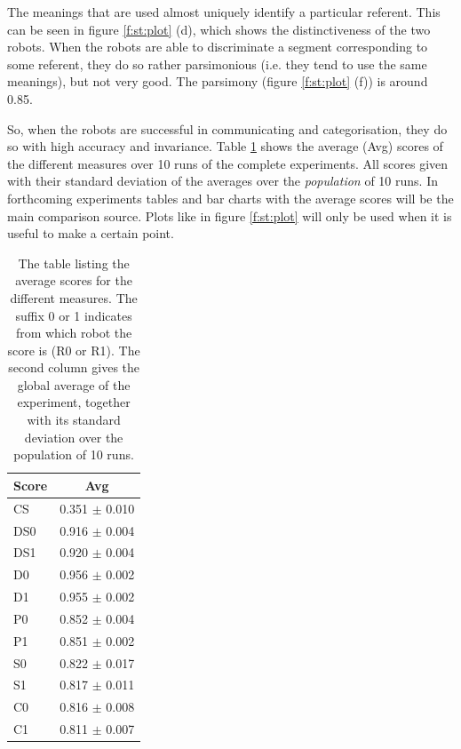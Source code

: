 The meanings that are used almost uniquely identify a particular referent. This can be seen in figure \ref{f:st:plot} (d), which shows the distinctiveness of the two robots. When the robots are able to discriminate a segment corresponding to some referent, they do so rather parsimonious (i.e. they tend to use the same meanings), but not very good. The parsimony (figure \ref{f:st:plot} (f)) is around 0.85. 

So, when the robots are successful in communicating and categorisation, they do so with high accuracy and invariance. Table \ref{t:st:averages} shows the average (Avg) scores of the different measures over 10 runs of the complete experiments. All scores given with their standard deviation of the averages over the {\em population} of 10 runs. In forthcoming experiments tables and bar charts with the average scores will be the main comparison source. Plots like in figure \ref{f:st:plot} will only be used when it is useful to make a certain point.

\begin{table}
\centering
\begin{tabular}{||l|c||}
\hline\hline
Score & Avg\\\hline
CS & 0.351 $\pm$ 0.010\\\hline
DS0 & 0.916 $\pm$ 0.004\\\hline
DS1 & 0.920 $\pm$ 0.004\\\hline
D0 & 0.956 $\pm$ 0.002\\\hline
D1 & 0.955 $\pm$ 0.002\\\hline
P0 & 0.852 $\pm$ 0.004\\\hline
P1 & 0.851 $\pm$ 0.002\\\hline
S0 & 0.822 $\pm$ 0.017\\\hline
S1 & 0.817 $\pm$ 0.011\\\hline
C0 & 0.816 $\pm$ 0.008\\\hline
C1 & 0.811 $\pm$ 0.007\\\hline
\hline
\end{tabular}
\caption{The table listing the average scores for the different measures. The suffix 0 or 1 indicates from which robot the score is (R0 or R1). The second column gives the global average of the experiment, together  with its standard deviation over the population of 10 runs.}
\label{t:st:averages}
\end{table}

